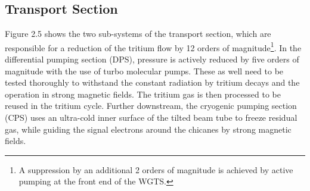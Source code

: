       
      \subsection{Transport Section}      
      Figure 2.5 shows the two sub-systems of the transport section, which are responsible for a reduction of the tritium flow by 12 orders of magnitude\footnote{A suppression by an additional 2 orders of magnitude is achieved by active pumping at the front end of the WGTS.}.
      In the differential pumping section (DPS), pressure is actively reduced by five orders of magnitude with the use of turbo molecular pumps. These as well need to be tested thoroughly to withstand the constant radiation by tritium decays \cite{tritiumTests} and the operation in strong magnetic fields. The tritium gas is then processed to be reused in the tritium cycle. Further downstream, the cryogenic pumping section (CPS) uses an ultra-cold inner surface of the tilted beam tube to freeze residual gas, while guiding the signal electrons around the chicanes by strong magnetic fields. 
